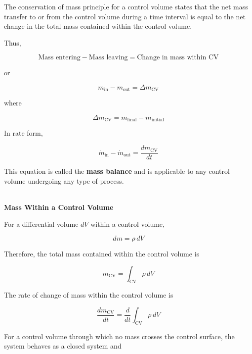 \documentclass[12pt]{article}
\begin{document}
The conservation of mass principle for a control volume states that the net mass transfer to or from the control volume during a time interval is equal to the net change in the total mass contained within the control volume.

Thus,

\begin{equation*}
\text{Mass entering}
-
\text{Mass leaving}
=
\text{Change in mass within CV}
\end{equation*}

or

\begin{equation*}
m_{\mathrm{in}} - m_{\mathrm{out}}
=
\Delta m_{\mathrm{CV}}
\end{equation*}

where

\begin{equation*}
\Delta m_{\mathrm{CV}}
=
m_{\mathrm{final}}-m_{\mathrm{initial}}
\end{equation*}

In rate form,

\begin{equation*}
\dot{m}_{\mathrm{in}}
-
\dot{m}_{\mathrm{out}}
=
\frac{dm_{\mathrm{CV}}}{dt}
\end{equation*}

This equation is called the \textbf{mass balance} and is applicable to any control volume undergoing any type of process.

\textbf{\\ Mass Within a Control Volume}

For a differential volume $dV$ within a control volume,

\begin{equation*}
dm = \rho \, dV
\end{equation*}

Therefore, the total mass contained within the control volume is

\begin{equation*}
m_{\mathrm{CV}}
=
\int_{\mathrm{CV}} \rho \, dV
\end{equation*}

The rate of change of mass within the control volume is

\begin{equation*}
\frac{dm_{\mathrm{CV}}}{dt}
=
\frac{d}{dt}
\int_{\mathrm{CV}} \rho \, dV
\end{equation*}

For a control volume through which no mass crosses the control surface, the system behaves as a closed system and
\end{document}
